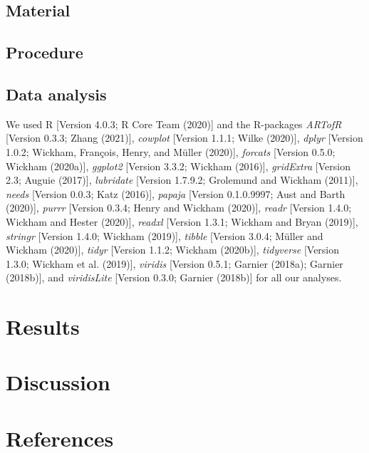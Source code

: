 \documentclass[
  english,
  man,floatsintext]{apa6}
\begin{document}
\hypertarget{material}{%
\subsection{Material}\label{material}}

\hypertarget{procedure}{%
\subsection{Procedure}\label{procedure}}

\hypertarget{data-analysis}{%
\subsection{Data analysis}\label{data-analysis}}

We used R {[}Version 4.0.3; R Core Team (2020){]} and the R-packages \emph{ARTofR} {[}Version 0.3.3; Zhang (2021){]}, \emph{cowplot} {[}Version 1.1.1; Wilke (2020){]}, \emph{dplyr} {[}Version 1.0.2; Wickham, François, Henry, and Müller (2020){]}, \emph{forcats} {[}Version 0.5.0; Wickham (2020a){]}, \emph{ggplot2} {[}Version 3.3.2; Wickham (2016){]}, \emph{gridExtra} {[}Version 2.3; Auguie (2017){]}, \emph{lubridate} {[}Version 1.7.9.2; Grolemund and Wickham (2011){]}, \emph{needs} {[}Version 0.0.3; Katz (2016){]}, \emph{papaja} {[}Version 0.1.0.9997; Aust and Barth (2020){]}, \emph{purrr} {[}Version 0.3.4; Henry and Wickham (2020){]}, \emph{readr} {[}Version 1.4.0; Wickham and Hester (2020){]}, \emph{readxl} {[}Version 1.3.1; Wickham and Bryan (2019){]}, \emph{stringr} {[}Version 1.4.0; Wickham (2019){]}, \emph{tibble} {[}Version 3.0.4; Müller and Wickham (2020){]}, \emph{tidyr} {[}Version 1.1.2; Wickham (2020b){]}, \emph{tidyverse} {[}Version 1.3.0; Wickham et al. (2019){]}, \emph{viridis} {[}Version 0.5.1; Garnier (2018a); Garnier (2018b){]}, and \emph{viridisLite} {[}Version 0.3.0; Garnier (2018b){]} for all our analyses.

\hypertarget{results}{%
\section{Results}\label{results}}

\hypertarget{discussion}{%
\section{Discussion}\label{discussion}}

\newpage

\hypertarget{references}{%
\section{References}\label{references}}
\end{document}
